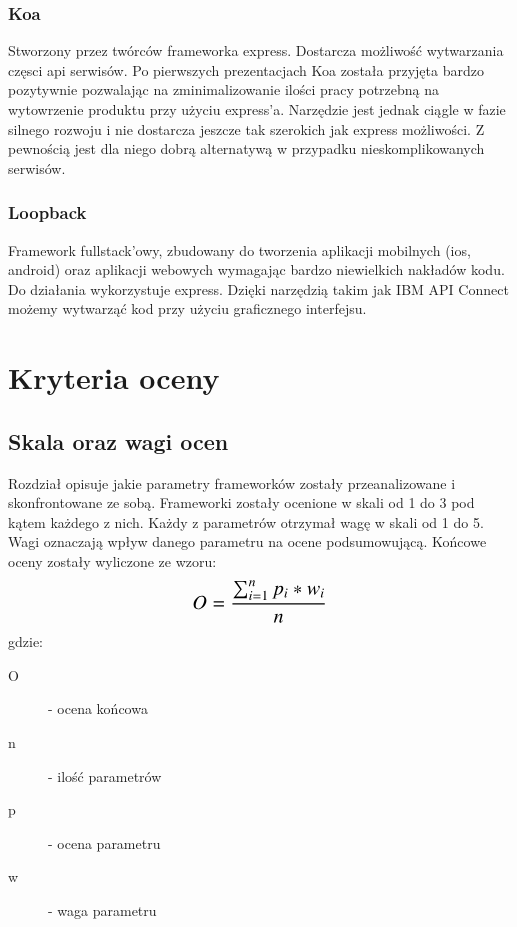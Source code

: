 \documentclass[12pt]{report}
\begin{document}
    \subsection{Koa}
    Stworzony przez twórców frameworka express.
    Dostarcza możliwość wytwarzania częsci api serwisów.
    Po pierwszych prezentacjach Koa została przyjęta bardzo pozytywnie pozwalając na zminimalizowanie ilości pracy potrzebną na wytowrzenie produktu przy użyciu express'a.
    Narzędzie jest jednak ciągle w fazie silnego rozwoju i nie dostarcza jeszcze tak szerokich jak express możliwości.
    Z pewnością jest dla niego dobrą alternatywą w przypadku nieskomplikowanych serwisów.

    \subsection{Loopback}
    Framework fullstack'owy, zbudowany do tworzenia aplikacji mobilnych (ios, android) oraz aplikacji webowych wymagając bardzo niewielkich nakładów kodu.
    Do działania wykorzystuje express.
    Dzięki narzędzią takim jak IBM API Connect możemy wytwarząć kod przy użyciu graficznego interfejsu.

\chapter{Kryteria oceny}

  \section{Skala oraz wagi ocen}
    Rozdział opisuje jakie parametry frameworków zostały przeanalizowane i skonfrontowane ze sobą.
    Frameworki zostały ocenione w skali od 1 do 3 pod kątem każdego z nich.
    Każdy z parametrów otrzymał wagę w skali od 1 do 5.
    Wagi oznaczają wpływ danego parametru na ocene podsumowującą.
    Końcowe oceny zostały wyliczone ze wzoru:
    \newline
    \newline
    \[\text{\Large$O = \frac{\sum_{i=1}^{n} p_{i} * w_{i}}{n}$}\]
    \newline
    gdzie:
    \begin{description}
      \item[O] - ocena końcowa
      \item[n] - ilość parametrów
      \item[p] - ocena parametru
      \item[w] - waga parametru
    \end{description}
\end{document}
